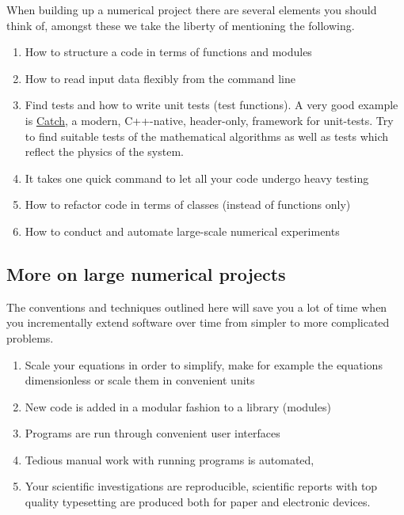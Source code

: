 \documentclass[%
oneside,                 %
final,                   %
10pt]{article}
\begin{document}
When building up a numerical project there are several elements you should think of, amongst these we take the liberty of mentioning the following.
\begin{enumerate}
 \item How to structure a code in terms of functions and modules

 \item How to read input data flexibly from the command line

 \item Find tests and how to write unit tests (test functions). A very good example is \href{{https://github.com/philsquared/Catch}}{Catch}, a modern, C++-native, header-only, framework for unit-tests. Try to find suitable tests of the mathematical algorithms as well as tests which reflect the physics of the system. 

 \item It takes one quick command to let all your code undergo heavy testing

 \item How to refactor code in terms of classes (instead of functions only)

 \item How to conduct and automate large-scale numerical experiments
\end{enumerate}

\noindent
\subsection*{More on large numerical projects}
The conventions and techniques outlined here will save you a lot of time when you incrementally extend software over time from simpler to more complicated problems.
\begin{enumerate}
\item Scale your equations in order to simplify, make for example the equations dimensionless or scale them in convenient units

\item New code is added in a modular fashion to a library (modules)

\item Programs are run through convenient user interfaces

\item Tedious manual work with running programs is automated,

\item Your scientific investigations are reproducible, scientific reports with top quality typesetting are produced both for paper and electronic devices.
\end{enumerate}
\end{document}
